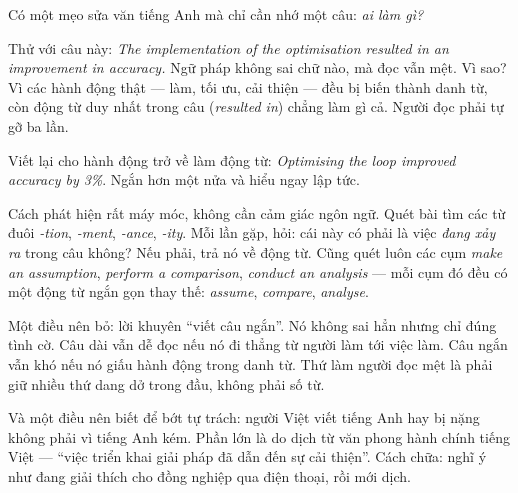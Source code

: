 \documentclass[../../english.tex]{subfiles}
\begin{document}
\begin{dongian}
Có một mẹo sửa văn tiếng Anh mà chỉ cần nhớ một câu: \emph{ai làm gì?}

Thử với câu này: \emph{The implementation of the optimisation resulted in an improvement in accuracy.} Ngữ pháp không sai chữ nào, mà đọc vẫn mệt. Vì sao? Vì các hành động thật --- làm, tối ưu, cải thiện --- đều bị biến thành danh từ, còn động từ duy nhất trong câu (\emph{resulted in}) chẳng làm gì cả. Người đọc phải tự gỡ ba lần.

Viết lại cho hành động trở về làm động từ: \emph{Optimising the loop improved accuracy by 3\%}. Ngắn hơn một nửa và hiểu ngay lập tức.

Cách phát hiện rất máy móc, không cần cảm giác ngôn ngữ. Quét bài tìm các từ đuôi \emph{-tion}, \emph{-ment}, \emph{-ance}, \emph{-ity}. Mỗi lần gặp, hỏi: cái này có phải là việc \emph{đang xảy ra} trong câu không? Nếu phải, trả nó về động từ. Cũng quét luôn các cụm \emph{make an assumption}, \emph{perform a comparison}, \emph{conduct an analysis} --- mỗi cụm đó đều có một động từ ngắn gọn thay thế: \emph{assume}, \emph{compare}, \emph{analyse}.

Một điều nên bỏ: lời khuyên ``viết câu ngắn''. Nó không sai hẳn nhưng chỉ đúng tình cờ. Câu dài vẫn dễ đọc nếu nó đi thẳng từ người làm tới việc làm. Câu ngắn vẫn khó nếu nó giấu hành động trong danh từ. Thứ làm người đọc mệt là phải giữ nhiều thứ dang dở trong đầu, không phải số từ.

Và một điều nên biết để bớt tự trách: người Việt viết tiếng Anh hay bị nặng không phải vì tiếng Anh kém. Phần lớn là do dịch từ văn phong hành chính tiếng Việt --- ``việc triển khai giải pháp đã dẫn đến sự cải thiện''. Cách chữa: nghĩ ý như đang giải thích cho đồng nghiệp qua điện thoại, rồi mới dịch.
\end{dongian}
\end{document}

